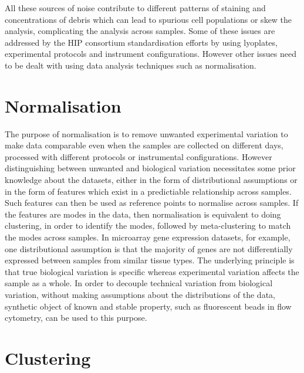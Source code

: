 All these sources of noise contribute to different patterns of staining and concentrations of debris
which can lead to spurious cell populations or skew the analysis, complicating the analysis across samples.
Some of these issues are addressed by the \gls{HIP} consortium standardisation efforts \citep{Maecker:2012gl}
by using lyoplates, experimental protocols and instrument configurations.
However other issues need to be dealt with using data analysis techniques such as normalisation.

\section{Normalisation}

The purpose of normalisation is to remove unwanted experimental variation to make data comparable even when the samples are
collected on different days, processed with different protocols or instrumental configurations.
However distinguishing between unwanted and biological variation necessitates some prior knowledge about the datasets, either in the form of distributional assumptions
or in the form of features which exist in a predictiable relationship across samples.
Such features can then be used as reference points to normalise across samples.
If the features are modes in the data, then normalisation is equivalent to doing clustering, in order to identify the modes,
followed by meta-clustering to match the modes across samples.
In microarray gene expression datasets, for example, one distributional assumption is that the majority of genes are not differentially expressed between samples from
similar tissue types.
The underlying principle is that true biological variation is specific whereas experimental variation affects the sample as a whole.
In order to decouple technical variation from biological variation, without making assumptions about the distributions of the data,
synthetic object of known and stable property, such as fluorescent beads in flow cytometry, can be used to this purpose.



\section{Clustering}


